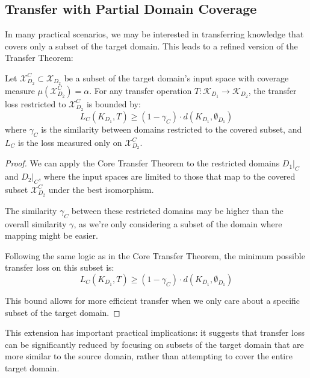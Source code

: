\subsection{Transfer with Partial Domain Coverage}

In many practical scenarios, we may be interested in transferring knowledge that covers only a subset of the target domain. This leads to a refined version of the Transfer Theorem:

\begin{theorem}
Let $\mathcal{X}_{D_2}^C \subset \mathcal{X}_{D_2}$ be a subset of the target domain's input space with coverage measure $\mu(\mathcal{X}_{D_2}^C) = \alpha$. For any transfer operation $T: \mathcal{K}_{D_1} \to \mathcal{K}_{D_2}$, the transfer loss restricted to $\mathcal{X}_{D_2}^C$ is bounded by:
\begin{equation}
L_C(K_{D_1}, T) \geq (1 - \gamma_C) \cdot d(K_{D_1}, \emptyset_{D_1})
\end{equation}
where $\gamma_C$ is the similarity between domains restricted to the covered subset, and $L_C$ is the loss measured only on $\mathcal{X}_{D_2}^C$.
\end{theorem}

\begin{proof}
We can apply the Core Transfer Theorem to the restricted domains $D_1|_C$ and $D_2|_C$, where the input spaces are limited to those that map to the covered subset $\mathcal{X}_{D_2}^C$ under the best isomorphism.

The similarity $\gamma_C$ between these restricted domains may be higher than the overall similarity $\gamma$, as we're only considering a subset of the domain where mapping might be easier.

Following the same logic as in the Core Transfer Theorem, the minimum possible transfer loss on this subset is:
\begin{equation}
L_C(K_{D_1}, T) \geq (1 - \gamma_C) \cdot d(K_{D_1}, \emptyset_{D_1})
\end{equation}

This bound allows for more efficient transfer when we only care about a specific subset of the target domain.
\end{proof}

This extension has important practical implications: it suggests that transfer loss can be significantly reduced by focusing on subsets of the target domain that are more similar to the source domain, rather than attempting to cover the entire target domain.

